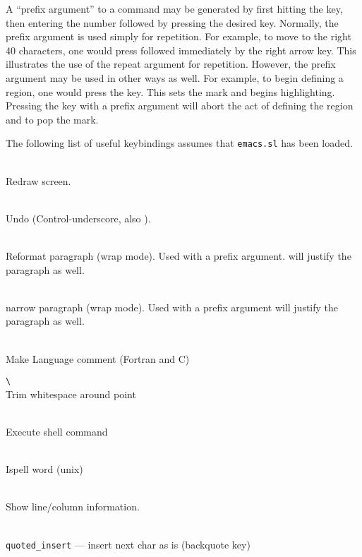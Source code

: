   A ``prefix argument'' to a command may be generated by first hitting the
   key, then entering the number followed by pressing the desired
  key.  Normally, the prefix argument is used simply for repetition.  For
  example, to move to the right 40 characters, one would press
   followed immediately by the right arrow key. This
  illustrates the use of the repeat argument for repetition.  However, the
  prefix argument may be used in other ways as well.  For example, to begin
  defining a region, one would press the  key.  This sets the
  mark and begins highlighting.  Pressing the  key with a prefix
  argument will abort the act of defining the region and to pop the mark.

  The following list of useful keybindings assumes that \verb|emacs.sl| has
  been loaded.

   \\
     Redraw screen.

   \\
     Undo  (Control-underscore, also ).

   \\
     Reformat paragraph (wrap mode).  Used with a prefix
     argument. will justify the paragraph as well.

    \\
                narrow paragraph (wrap mode).  Used with a prefix
                argument will justify the paragraph as well.

    \\
                Make Language comment (Fortran and C)
                
     \verb|\|\\
                Trim whitespace around point
                
    \\
                Execute shell command
                
    \\
                Ispell word (unix)
                
    \\
                Show line/column information.
                
      \\
                \verb|quoted_insert| --- insert next char as is (backquote key)
                
